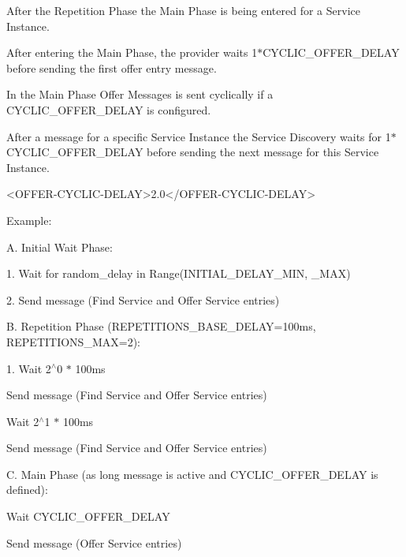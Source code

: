 \begin{DoxyItemize}
\item After the Repetition Phase the Main Phase is being entered for a Service Instance.
\item After entering the Main Phase, the provider waits 1$\ast$\+C\+Y\+C\+L\+I\+C\+\_\+\+O\+F\+F\+E\+R\+\_\+\+D\+E\+L\+AY before sending the first offer entry message.
\item In the Main Phase Offer Messages is sent cyclically if a C\+Y\+C\+L\+I\+C\+\_\+\+O\+F\+F\+E\+R\+\_\+\+D\+E\+L\+AY is configured.
\item After a message for a specific Service Instance the Service Discovery waits for 1$\ast$\+C\+Y\+C\+L\+I\+C\+\_\+\+O\+F\+F\+E\+R\+\_\+\+D\+E\+L\+AY before sending the next message for this Service Instance. 
\begin{DoxyCode}
<\textcolor{keywordtype}{OFFER-CYCLIC-DELAY}>2.0</\textcolor{keywordtype}{OFFER-CYCLIC-DELAY}>
\end{DoxyCode}

\item Example\+:
\item A. Initial Wait Phase\+:
\begin{DoxyItemize}
\item 1. Wait for random\+\_\+delay in Range(\+I\+N\+I\+T\+I\+A\+L\+\_\+\+D\+E\+L\+A\+Y\+\_\+\+M\+I\+N, \+\_\+\+M\+A\+X)
\item 2. Send message (Find Service and Offer Service entries)
\end{DoxyItemize}
\item B. Repetition Phase (R\+E\+P\+E\+T\+I\+T\+I\+O\+N\+S\+\_\+\+B\+A\+S\+E\+\_\+\+D\+E\+L\+AY=100ms, R\+E\+P\+E\+T\+I\+T\+I\+O\+N\+S\+\_\+\+M\+AX=2)\+:
\begin{DoxyItemize}
\item 1. Wait 2$^\wedge$0 $\ast$ 100ms
\item Send message (Find Service and Offer Service entries)
\item Wait 2$^\wedge$1 $\ast$ 100ms
\item Send message (Find Service and Offer Service entries)
\end{DoxyItemize}
\item C. Main Phase (as long message is active and C\+Y\+C\+L\+I\+C\+\_\+\+O\+F\+F\+E\+R\+\_\+\+D\+E\+L\+AY is defined)\+:
\begin{DoxyItemize}
\item Wait C\+Y\+C\+L\+I\+C\+\_\+\+O\+F\+F\+E\+R\+\_\+\+D\+E\+L\+AY
\item Send message (Offer Service entries)
\end{DoxyItemize}
\end{DoxyItemize}

